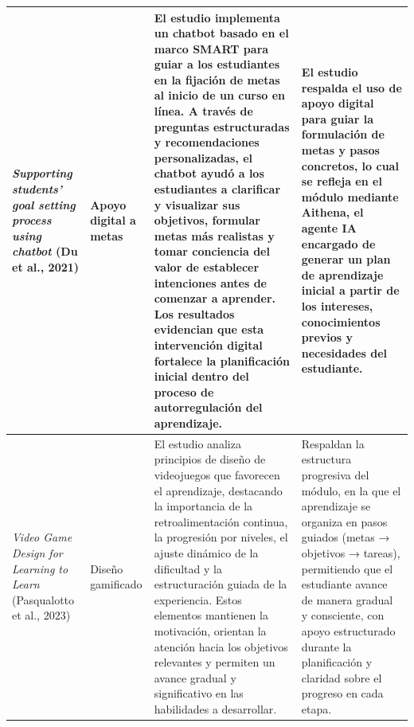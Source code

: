 \begin{center}
\begin{longtable}{| m{4.2cm} | m{3cm} | m{4.5cm} | m{4.5cm} |}
    \textit{Supporting students’ goal setting process using chatbot} (Du et al., 2021) \cite{du_etal_2021_chatbot_goals} &
    Apoyo digital a metas &
    El estudio implementa un chatbot basado en el marco SMART para guiar a los estudiantes en la fijación de metas al inicio de un curso en línea. A través de preguntas estructuradas y recomendaciones personalizadas, el chatbot ayudó a los estudiantes a clarificar y visualizar sus objetivos, formular metas más realistas y tomar conciencia del valor de establecer intenciones antes de comenzar a aprender. Los resultados evidencian que esta intervención digital fortalece la planificación inicial dentro del proceso de autorregulación del aprendizaje. &
    El estudio respalda el uso de apoyo digital para guiar la formulación de metas y pasos concretos, lo cual se refleja en el módulo mediante Aithena, el agente IA encargado de generar un plan de aprendizaje inicial a partir de los intereses, conocimientos previos y necesidades del estudiante. \\
    \hline
    
    \textit{Video Game Design for Learning to Learn} (Pasqualotto et al., 2023) \cite{pasqualotto_2023_videogame_learn2learn} &
    Diseño gamificado &
    El estudio analiza principios de diseño de videojuegos que favorecen el aprendizaje, destacando la importancia de la retroalimentación continua, la progresión por niveles, el ajuste dinámico de la dificultad y la estructuración guiada de la experiencia. Estos elementos mantienen la motivación, orientan la atención hacia los objetivos relevantes y permiten un avance gradual y significativo en las habilidades a desarrollar. &
    Respaldan la estructura progresiva del módulo, en la que el aprendizaje se organiza en pasos guiados (metas → objetivos → tareas), permitiendo que el estudiante avance de manera gradual y consciente, con apoyo estructurado durante la planificación y claridad sobre el progreso en cada etapa. \\
    \hline

    \end{longtable}
\end{center}

